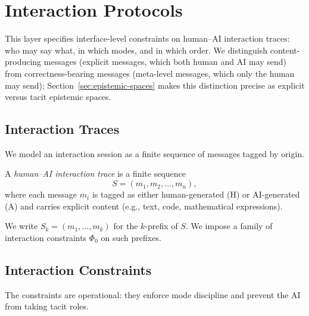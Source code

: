 
\section{Interaction Protocols}
\label{sec:interaction-protocols}

This layer specifies interface-level constraints on human--AI interaction traces: who may say what, in which modes, and in which order. We distinguish content-producing messages (explicit messages, which both human and AI may send) from correctness-bearing messages (meta-level messages, which only the human may send); Section~\ref{sec:epistemic-spaces} makes this distinction precise as explicit versus tacit epistemic spaces.

\subsection{Interaction Traces}

We model an interaction session as a finite sequence of messages tagged by origin.

\begin{definition}
A \emph{human--AI interaction trace} is a finite sequence
\[
S = (m_1, m_2, \dots, m_n),
\]
where each message \(m_i\) is tagged as either human-generated (H) or AI-generated (A) and carries explicit content (e.g., text, code, mathematical expressions).
\end{definition}

We write \(S_k = (m_1,\dots,m_k)\) for the \(k\)-prefix of \(S\). We impose a family of interaction constraints \(\Phi_0\) on such prefixes.

\subsection{Interaction Constraints}

The constraints are operational: they enforce mode discipline and prevent the AI from taking tacit roles.

